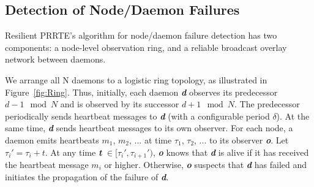 \documentclass[sigconf]{acmart}
\newcommand{\prrte}[0]{\textsc{PRRTE}\xspace}
\begin{document}
\subsection{Detection of Node/Daemon Failures}

Resilient \prrte's algorithm for node/daemon failure detection has two
components: a node-level observation ring, and a reliable broadcast overlay network between daemons.

We arrange all N daemons to a logistic ring topology, as illustrated in Figure~\ref{fig:Ring}.
Thus, initially, each daemon \textbf{\textit{d}} observes its predecessor $d-1 \mod{N}$ and is observed by
its successor $d+1 \mod{N}$. The predecessor periodically sends heartbeat messages to \textbf{\textit{d}} (with a
configurable period $\delta$). At the same time, \textbf{\textit{d}} sends heartbeat messages to its own observer. For each node, a daemon emits heartbeats $m_1$, $m_2$, ... at time $\tau_1$, $\tau_2$, ... to its observer \textbf{\textit{o}}. Let $\tau_i' = \tau_i + t$. At any time \textbf{\textit{t}} $\in [\tau_i', \tau_{i+1}')$, \textbf{\textit{o}} knows that \textbf{\textit{d}} is alive if it has received the
heartbeat message $m_i$ or higher. Otherwise, \textbf{\textit{o}} suspects that \textbf{\textit{d}} has failed and initiates the propagation of the
failure of \textbf{\textit{d}}.
\end{document}
